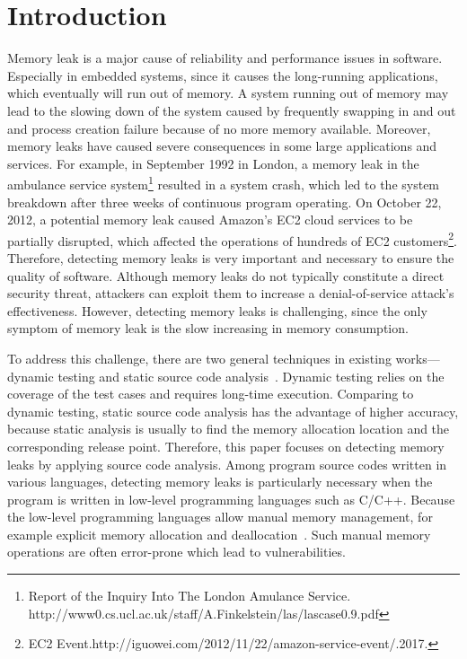 \section{Introduction}\label{sec:intro}
Memory leak is a major cause of reliability and performance issues in software. Especially in embedded systems, since it causes the long-running applications, which eventually will run out of memory. 
A system running out of memory may lead to the slowing down of the system caused by frequently swapping in and out and process creation failure because of no more memory available. Moreover, memory leaks have caused severe consequences in some large applications and services. For example, in September 1992 in London, a memory leak in the ambulance service system\footnote{Report of the Inquiry Into The London Amulance Service. http://www0.cs.ucl.ac.uk/staff/A.Finkelstein/las/lascase0.9.pdf} resulted in a system crash, which led to the system breakdown after three weeks of continuous program operating. On October 22, 2012, a potential memory leak caused Amazon's EC2 cloud services to be partially disrupted, which affected the operations of hundreds of EC2 customers\footnote{EC2 Event.http://iguowei.com/2012/11/22/amazon-service-event/.2017.}. 
Therefore, detecting memory leaks is very important and necessary to ensure the quality of software. Although memory leaks do not typically constitute a direct security threat, attackers can exploit them to increase a denial-of-service attack’s effectiveness.
However, detecting memory leaks is challenging, since the only symptom of memory leak is the slow increasing in memory consumption.  

To address this challenge, there are two general techniques in existing works---dynamic testing and static source code analysis~\cite{AJ06}. 
Dynamic testing relies on the coverage of the test cases and requires long-time execution. Comparing to dynamic testing, static source code analysis has the advantage of higher accuracy, because static analysis is usually to find the memory allocation location and the corresponding release point.
Therefore, this paper focuses on detecting memory leaks by applying source code analysis.
Among program source codes written in various languages, detecting memory leaks is particularly necessary when the program is written in low-level programming languages such as C/C++. Because the low-level programming languages allow manual memory management, for example explicit memory allocation and deallocation~\cite{KJMP06}. Such manual memory operations are often error-prone which lead to vulnerabilities. 

